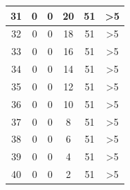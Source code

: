 \begin{longtable}{|c|c|c|c|c|c|}
	31                                           & 0                      & 0                     & 20                    & 51                     & >5                                                \\ \hline
	32                                           & 0                      & 0                     & 18                    & 51                     & >5                                        \\ \hline
	33                                           & 0                      & 0                     & 16                    & 51                     & >5                                             \\ \hline
	34                                           & 0                      & 0                     & 14                    & 51                     & >5                                        \\ \hline
	35                                           & 0                      & 0                     & 12                    & 51                     & >5                                                \\ \hline
	36                                           & 0                      & 0                     & 10                    & 51                     & >5                                                \\ \hline
	37                                           & 0                      & 0                     & 8                     & 51                     & >5                                              \\ \hline
	38                                           & 0                      & 0                     & 6                     & 51                     & >5                                                \\ \hline
	39                                           & 0                      & 0                     & 4                     & 51                     & >5                                               \\ \hline
	40                                           & 0                      & 0                     & 2                     & 51                     & >5                                              \\ \hline
\end{longtable}
\fontsize{12}{15}\selectfont
